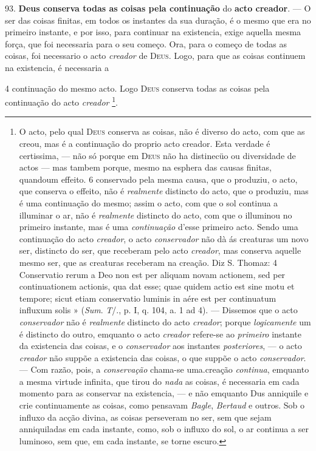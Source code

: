  93. \textbf{Deus conserva todas as coisas pela continuação} do \textbf{acto creador}. --- O ser das coisas finitas, em todos os instantes da sua duração, é o mesmo que era no primeiro instante, e por isso, para continuar na existencia, exige aquella mesma força, que foi necessaria para o seu começo. Ora, para o começo de todas as coisas, foi necessario o acto \emph{creador} de \textsc{Deus}. Logo, para que as coisas continuem na existencia, é necessaria a

4 continuação do mesmo acto. Logo \textsc{Deus} conserva todas as coisas pela continuação do acto \emph{creador} \footnote{O acto, pelo qual \textsc{Deus} conserva as coisas, não é diverso do acto, com que as creou, mas é a continuação do proprio acto creador. Esta verdade é certissima, --- não só porque em \textsc{Deus} não ha distinecüo ou diversidade de actos --- mas tambem porque, mesmo na esphera das causas finitas, quandoum effeito. 6 conservado pela mesma causa, que o produziu, o acto, que conserva o effeito, não é \emph{realmente} distincto do acto, que o produziu, mas é uma continuação do mesmo; assim o acto, com que o sol continua a illuminar o ar, não é \emph{realmente} distincto do acto, com que o illuminou no primeiro instante, mas é uma \emph{continuação} d'esse primeiro acto. Sendo uma continuação do acto \emph{creador}, o acto \emph{conservador} não dà ás creaturas um novo ser, distincto do ser, que receberam pelo acto \emph{creador}, mas conserva aquelle mesmo ser, que as creaturas receberam na creação. Diz S. Thomaz: 4 Conservatio rerum a Deo non est per aliquam novam actionem, sed per continuationem actionis, qua dat esse; quae quidem actio est sine motu et tempore; sicut etiam conservatio luminis in aére est per continuatum influxum solis » (\emph{Sum}. \emph{T}/., p. I, q. 104, a. 1 ad 4). --- Dissemos que o acto \emph{conservador} não é \emph{realmente} distincto do acto \emph{creador}; porque \emph{logicamente} um é distincto do outro, emquanto o acto \emph{creador} refere-se ao \emph{primeiro} instante da existencia das coisas, e o \emph{conservador} aos instantes \emph{posteriores}, --- o acto \emph{creador} não suppõe a existencia das coisas, o que suppõe o acto \emph{conservador}. --- Com razão, pois, a \emph{conservação} chama-se uma.creação \emph{continua}, emquanto a mesma virtude infinita, que tirou do \emph{nada} as coisas, é necessaria em cada momento para as conservar na existencia, --- e não emquanto Dus anniquile e crie continuamente as coisas, como pensavam \emph{Bagle}, \emph{Bertaud} e outros. Sob o influxo da acção divina, as coisas perseveram no ser, sem que sejam anniquiladas em cada instante, como, sob o influxo do sol, o ar continua a ser luminoso, sem que, em cada instante, se torne escuro.}.

